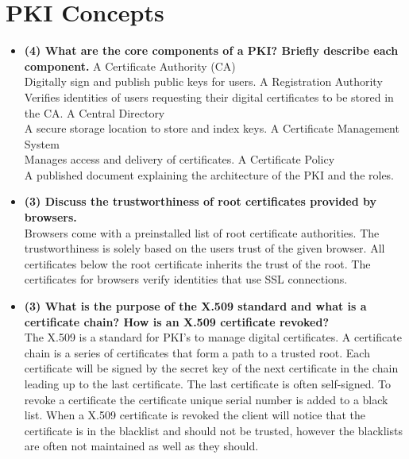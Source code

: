 \documentclass[letterpaper,11pt,notitlepage,fleqn]{article}
\begin{document}
\section{PKI Concepts}
\begin{itemize}
    \item \textbf{(4)  What  are  the  core  components  of  a  PKI?  Briefly  describe  each component.}
        \subitem A Certificate Authority (CA) \\
        Digitally sign and publish public keys for users.
        \subitem A Registration Authority \\
        Verifies identities of users requesting their digital certificates to be stored in the CA.
        \subitem A Central Directory \\
        A secure storage location to store and index keys.
        \subitem A Certificate Management System \\
        Manages access and delivery of certificates. 
        \subitem A Certificate Policy \\
        A published document explaining the architecture of the PKI and the roles.
    \item \textbf{(3) Discuss the trustworthiness of root certificates provided by browsers.} \\
Browsers come with a preinstalled list of root certificate authorities. The trustworthiness is solely based on the users trust of the given browser. All certificates below the root certificate inherits the trust of the root. The certificates for browsers verify identities that use SSL connections.

    \item \textbf{(3)  What  is  the  purpose  of  the  X.509  standard  and  what  is  a  certificate chain? How is an X.509 certificate revoked?} \\
        The X.509 is a standard for PKI's to manage digital certificates. A certificate chain is a series of certificates that form a path to a trusted root. Each certificate will be signed by the secret key of the next certificate in the chain leading up to the last certificate. The last certificate is often self-signed. To revoke a certificate the certificate unique serial number is added to a black list. When a X.509 certificate is revoked the client will notice that the
        certificate is in the blacklist and should not be trusted, however the blacklists are often not maintained as well as they should. 
\end{itemize}

\medskip


\end{document}
